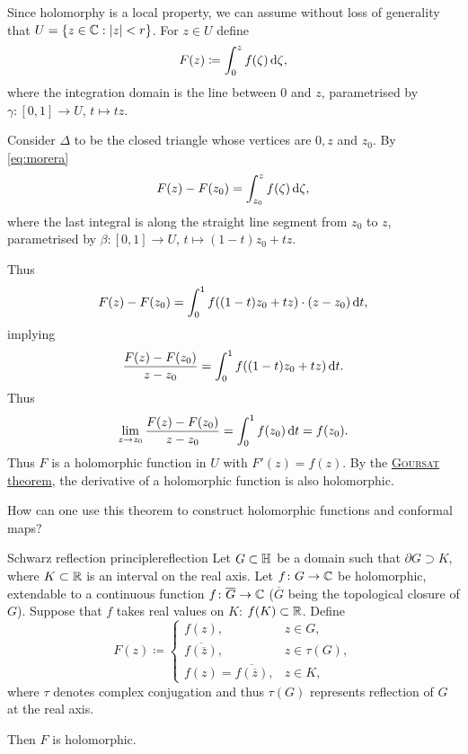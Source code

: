 \documentclass[a4paper,english]{article}
\begin{document}
\begin{pr}
    Since holomorphy is a local property, we can assume without loss of generality that $U = \{ z \in \operatorname{\mathbb{C}}: | z | < r \}$.
    For $z \in U$ define
    \begin{equation*}
        F(z)
        \coloneqq \int_{0}^{z} f(\zeta) \mathop{}\!\mathrm{d}{\zeta},
    \end{equation*}
    where the integration domain is the line between 0 and $z$, parametrised by $\gamma \colon [0, 1] \to U$, $t \mapsto t z$.
    
    Consider $\Delta$ to be the closed triangle whose vertices are $0, z$ and $z_0$.
    By \eqref{eq:morera}
    \begin{equation*}
        F(z) - F(z_0)
        = \int_{z_0}^{z} f(\zeta) \mathop{}\!\mathrm{d}{\zeta},
    \end{equation*}
    where the last integral is along the straight line segment from $z_0$ to $z$, parametrised by $\beta \colon [0, 1] \to U$, $t \mapsto (1 - t) z_0 + t z$.
    
    Thus
    \begin{equation*}
        F(z) - F(z_0)
        = \int_{0}^{1} f((1 - t) z_0 + t z) \cdot (z - z_0) \mathop{}\!\mathrm{d}{t},
    \end{equation*}
    implying
    \begin{equation*}
        \frac{F(z) - F(z_0)}{z - z_0}
        = \int_{0}^{1} f((1 - t) z_0 + t z) \mathop{}\!\mathrm{d}{t}.
    \end{equation*}
    Thus
    \begin{equation*}
        \lim_{z \to z_0} \frac{F(z) - F(z_0)}{z - z_0}
        = \int_{0}^{1} f(z_0) \mathop{}\!\mathrm{d}{t}
        = f(z_0).
    \end{equation*}
    Thus $F$ is a holomorphic function in $U$ with $F'(z) = f(z)$.
    By the \hyperref[cor:goursat]{\textsc{Goursat} theorem}, the derivative of a holomorphic function is also holomorphic.
\end{pr}

How can one use this theorem to construct holomorphic functions and conformal maps?

\begin{thm}{Schwarz reflection principle}{reflection}
    Let $G \subset \mathbb{H}$ be a domain such that $\partial G \supset K$, where $K \subset \operatorname{\mathbb{R}}$ is an interval on the real axis.
    Let $f \colon G \to \operatorname{\mathbb{C}}$ be holomorphic, extendable to a continuous function $f \colon \overline{G} \to \operatorname{\mathbb{C}}$ ($\overline{G}$ being the topological closure of $G$).
    Suppose that $f$ takes real values on $K$: $f(K) \subset \operatorname{\mathbb{R}}$.
    Define
    \begin{equation*}
        F(z) \coloneqq \begin{cases}
            f(z), & z \in G, \\
            \overline{f(\overline{z})}, & z \in \tau(G), \\
            f(z) = \overline{f(\overline{z})}, & z \in K,
        \end{cases}
    \end{equation*}
    where $\tau$ denotes complex conjugation and thus $\tau(G)$ represents reflection of $G$ at the real axis.
    
    Then $F$ is holomorphic.
\end{thm} 
\end{document}
